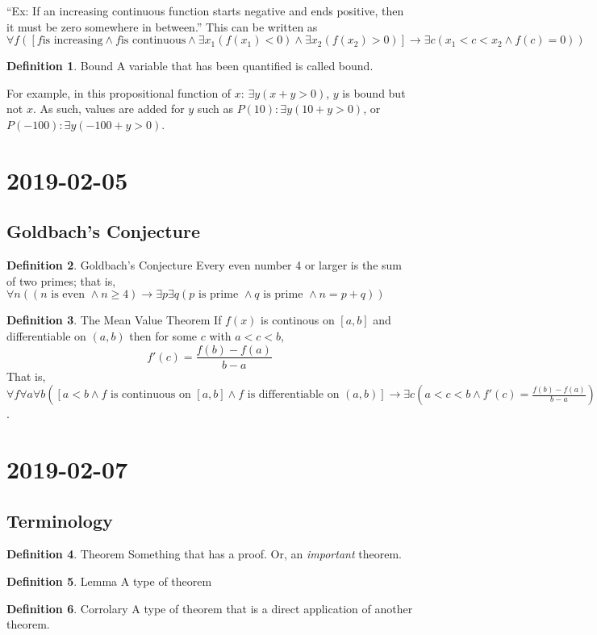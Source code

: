 \documentclass{article}
\theoremstyle{definition}
\newtheorem{definition}{Definition}[section]
\begin{document}
``Ex: If an increasing continuous function starts negative and ends positive,
then it must be zero somewhere in between.'' This can be written as
$\forall f ([ f \text{is increasing} \land f \text{is continuous} \land
\exists x_1 (f(x_1) < 0) \land \exists x_2 (f(x_2) > 0)] \rightarrow
\exists c (x_1 < c < x_2 \land f(c) = 0))$

\begin{definition}{Bound}
  A variable that has been quantified is called bound.
\end{definition}

For example, in this propositional function of $x$: $\exists y (x + y > 0)$,
$y$ is bound but not $x$. As such, values are added for $y$ such as
$P(10): \exists y (10+y > 0)$, or $P(-100): \exists y (-100 + y > 0)$. 

\section*{2019-02-05}

\subsection*{Goldbach's Conjecture}

\begin{definition}{Goldbach's Conjecture}
  Every even number 4 or larger is the sum of two primes; that is,
  $\forall n ( ( n \text{ is even } \land n \geq 4 ) \rightarrow 
  \exists p \exists q ( p \text{ is prime } \land q \text{ is prime }
  \land n = p + q ) )$
\end{definition}

\begin{definition}{The Mean Value Theorem}
  If $f(x)$ is continous on $[a,b]$ and differentiable on $(a,b)$ then for
  some $c$ with $a<c<b$, $$f'(c) = \frac{f(b)-f(a)}{b-a}$$
  That is, $\forall f \forall a \forall b ([a < b \land f \text{ is
  continuous on } [a,b] \land f \text{ is differentiable on } (a,b)] \to
  \exists c (a < c < b \land f'(c) = \frac{f(b)-f(a)}{b-a}) )$.
\end{definition}

\section*{2019-02-07}
\subsection*{Terminology}
\begin{definition}{Theorem}
  Something that has a proof. Or, an \textit{important} theorem.
\end{definition}
\begin{definition}{Lemma}
  A type of theorem
\end{definition}
\begin{definition}{Corrolary}
  A type of theorem that is a direct application of another theorem.
\end{definition}
\end{document}
